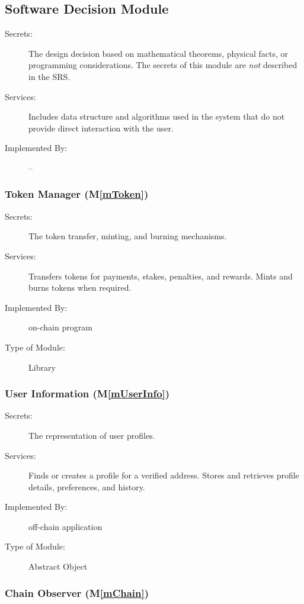 \documentclass[12pt, titlepage]{article}
\newcommand{\mref}[1]{M\ref{#1}}
\begin{document}
\subsection{Software Decision Module}

\begin{description}
\item[Secrets:] The design decision based on mathematical theorems, physical
  facts, or programming considerations. The secrets of this module are
  \emph{not} described in the SRS.
\item[Services:] Includes data structure and algorithms used in the system that
  do not provide direct interaction with the user. 
\item[Implemented By:] --
\end{description}

\subsubsection{Token Manager (\mref{mToken})}

\begin{description}
\item[Secrets:] The token transfer, minting, and burning mechanisms.
\item[Services:] Transfers tokens for payments, stakes, penalties, and
  rewards. Mints and burns tokens when required.
\item[Implemented By:] \progname{} on-chain program
\item[Type of Module:] Library
\end{description}

\subsubsection{User Information (\mref{mUserInfo})}

\begin{description}
\item[Secrets:] The representation of user profiles.
\item[Services:] Finds or creates a profile for a verified address. Stores
  and retrieves profile details, preferences, and history.
\item[Implemented By:] \progname{} off-chain application
\item[Type of Module:] Abstract Object
\end{description}

\subsubsection{Chain Observer (\mref{mChain})}
\end{document}
